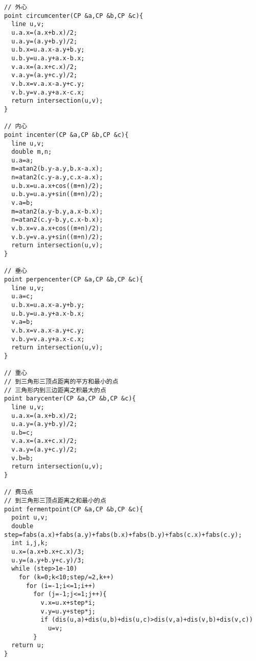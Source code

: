 \begin{lstlisting}[language={}]
// 外心
point circumcenter(CP &a,CP &b,CP &c){
  line u,v;
  u.a.x=(a.x+b.x)/2;
  u.a.y=(a.y+b.y)/2;
  u.b.x=u.a.x-a.y+b.y;
  u.b.y=u.a.y+a.x-b.x;
  v.a.x=(a.x+c.x)/2;
  v.a.y=(a.y+c.y)/2;
  v.b.x=v.a.x-a.y+c.y;
  v.b.y=v.a.y+a.x-c.x;
  return intersection(u,v);
}

// 内心
point incenter(CP &a,CP &b,CP &c){
  line u,v;
  double m,n;
  u.a=a;
  m=atan2(b.y-a.y,b.x-a.x);
  n=atan2(c.y-a.y,c.x-a.x);
  u.b.x=u.a.x+cos((m+n)/2);
  u.b.y=u.a.y+sin((m+n)/2);
  v.a=b;
  m=atan2(a.y-b.y,a.x-b.x);
  n=atan2(c.y-b.y,c.x-b.x);
  v.b.x=v.a.x+cos((m+n)/2);
  v.b.y=v.a.y+sin((m+n)/2);
  return intersection(u,v);
}

// 垂心
point perpencenter(CP &a,CP &b,CP &c){
  line u,v;
  u.a=c;
  u.b.x=u.a.x-a.y+b.y;
  u.b.y=u.a.y+a.x-b.x;
  v.a=b;
  v.b.x=v.a.x-a.y+c.y;
  v.b.y=v.a.y+a.x-c.x;
  return intersection(u,v);
}

// 重心
// 到三角形三顶点距离的平方和最小的点
// 三角形内到三边距离之积最大的点
point barycenter(CP &a,CP &b,CP &c){
  line u,v;
  u.a.x=(a.x+b.x)/2;
  u.a.y=(a.y+b.y)/2;
  u.b=c;
  v.a.x=(a.x+c.x)/2;
  v.a.y=(a.y+c.y)/2;
  v.b=b;
  return intersection(u,v);
}

// 费马点
// 到三角形三顶点距离之和最小的点
point fermentpoint(CP &a,CP &b,CP &c){
  point u,v;
  double step=fabs(a.x)+fabs(a.y)+fabs(b.x)+fabs(b.y)+fabs(c.x)+fabs(c.y);
  int i,j,k;
  u.x=(a.x+b.x+c.x)/3;
  u.y=(a.y+b.y+c.y)/3;
  while (step>1e-10)
    for (k=0;k<10;step/=2,k++)
      for (i=-1;i<=1;i++)
        for (j=-1;j<=1;j++){
          v.x=u.x+step*i;
          v.y=u.y+step*j;
          if (dis(u,a)+dis(u,b)+dis(u,c)>dis(v,a)+dis(v,b)+dis(v,c))
            u=v;
        }
  return u;
}
\end{lstlisting}

